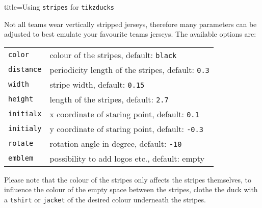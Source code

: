 \documentclass[parskip=half]{scrartcl}
\begin{document}
\begin{tcblisting}{title={Using \texttt{stripes} for \texttt{tikzducks}}}
\begin{tikzpicture}
	\duck[longhair,|stripes|={\stripes}]
\end{tikzpicture}
\end{tcblisting}

Not all teams wear vertically stripped jerseys, therefore many parameters can be adjusted to best emulate your favourite teams jerseys. The available options are:

\begin{tabular}{@{}ll@{}}
	\lstinline|color|			& colour of the stripes, default: 		
													\lstinline|black| \\
  \lstinline|distance|	&	periodicity length of the stripes, default: 
  												 \lstinline|0.3| \\
  \lstinline|width|			&	stripe width, default: \lstinline|0.15| \\ 
  \lstinline|height|		&	length of the stripes, default: 
  												\lstinline|2.7| \\
  \lstinline|initialx|	&	x coordinate of staring point, default: 
  												\lstinline|0.1| \\
  \lstinline|initialy|	&	y coordinate of staring point, default: 
  												\lstinline|-0.3| \\
  \lstinline|rotate|		&	rotation angle in degree, default:
  												\lstinline|-10|\\
  \lstinline|emblem|		& possibility to add logos etc., default: empty\\
\end{tabular}

Please note that the colour of the stripes only affects the stripes themselves, to influence the colour of the empty space between the stripes, clothe the duck with a \lstinline|tshirt| or \lstinline|jacket| of the desired colour underneath the stripes.
\end{document}
